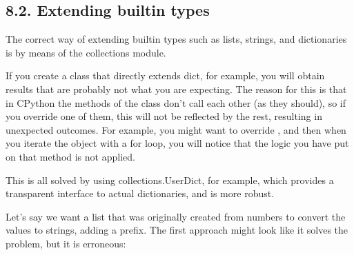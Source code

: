\documentclass[a4paper,10pt,english]{sphinxmanual}
\begin{document}
\begin{sphinxVerbatim}[commandchars=\\\{\}]
    
           
      
      

     
\end{sphinxVerbatim}


\subsection{8.2. Extending built\sphinxhyphen{}in types}
\label{\detokenize{chapters/2_pythonic_code/index:extending-built-in-types}}
The correct way of extending built\sphinxhyphen{}in types such as lists, strings, and dictionaries is by means of the collections
module.

If you create a class that directly extends dict, for example, you will obtain results that are probably not what you
are expecting. The reason for this is that in CPython the methods of the class don’t call each other (as they should),
so if you override one of them, this will not be reflected by the rest, resulting in unexpected outcomes. For example,
you might want to override , and then when you iterate the object with a for loop, you will notice that
the logic you have put on that method is not applied.

This is all solved by using collections.UserDict, for example, which provides a transparent interface to actual
dictionaries, and is more robust.

Let’s say we want a list that was originally created from numbers to convert the values to strings, adding a prefix. The
first approach might look like it solves the problem, but it is erroneous:
\end{document}
